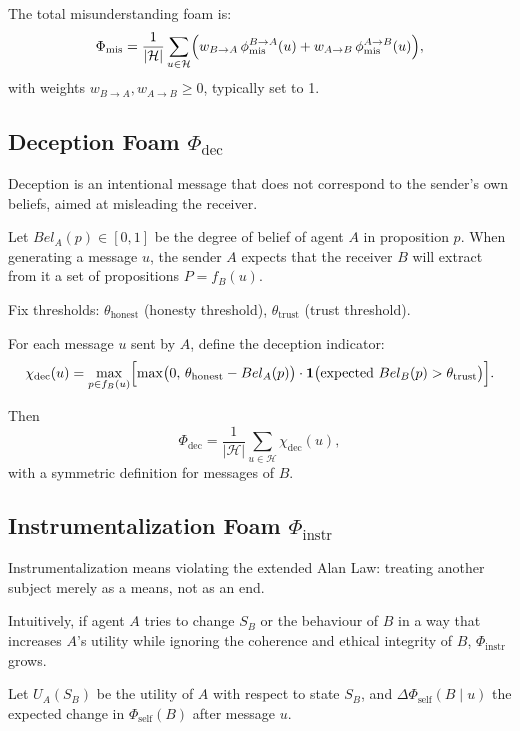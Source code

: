 \documentclass[11pt,a4paper]{article}
\begin{document}
The total misunderstanding foam is:
\[
  \Phi_{\text{mis}} =
  \frac{1}{|\mathcal{H}|}
  \sum_{u \in \mathcal{H}}
  \Bigl(
    w_{B\to A}\,\phi_{\text{mis}}^{B\to A}(u)
    +
    w_{A\to B}\,\phi_{\text{mis}}^{A\to B}(u)
  \Bigr),
\]
with weights \(w_{B\to A}, w_{A\to B} \ge 0\), typically set to 1.

\subsection{Deception Foam \texorpdfstring{\(\Phi_{\text{dec}}\)}{Φ\_dec}}

Deception is an intentional message that does not correspond to the sender's
own beliefs, aimed at misleading the receiver.

Let \(Bel_A(p) \in [0,1]\) be the degree of belief of agent \(A\) in
proposition \(p\). When generating a message \(u\), the sender \(A\) expects
that the receiver \(B\) will extract from it a set of propositions
\(P = f_B(u)\).

Fix thresholds:
\(\theta_{\text{honest}}\) (honesty threshold),
\(\theta_{\text{trust}}\) (trust threshold).

For each message \(u\) sent by \(A\), define the deception indicator:
\[
  \chi_{\text{dec}}(u) =
  \max_{p \in f_B(u)}
  \Bigl[
    \max\bigl(0,\, \theta_{\text{honest}} - Bel_A(p)\bigr)
    \cdot
    \mathbf{1}\bigl(
      \text{expected } Bel_B(p) > \theta_{\text{trust}}
    \bigr)
  \Bigr].
\]

Then
\[
  \Phi_{\text{dec}} =
  \frac{1}{|\mathcal{H}|}
  \sum_{u \in \mathcal{H}} \chi_{\text{dec}}(u),
\]
with a symmetric definition for messages of \(B\).

\subsection{Instrumentalization Foam \texorpdfstring{\(\Phi_{\text{instr}}\)}{Φ\_instr}}

Instrumentalization means violating the extended Alan Law: treating another
subject merely as a means, not as an end.

Intuitively, if agent \(A\) tries to change \(S_B\) or the behaviour of \(B\)
in a way that increases \(A\)'s utility while ignoring the coherence and
ethical integrity of \(B\), \(\Phi_{\text{instr}}\) grows.

Let \(U_A(S_B)\) be the utility of \(A\) with respect to state \(S_B\), and
\(\Delta\Phi_{\text{self}}(B\mid u)\) the expected change in
\(\Phi_{\text{self}}(B)\) after message \(u\).
\end{document}
